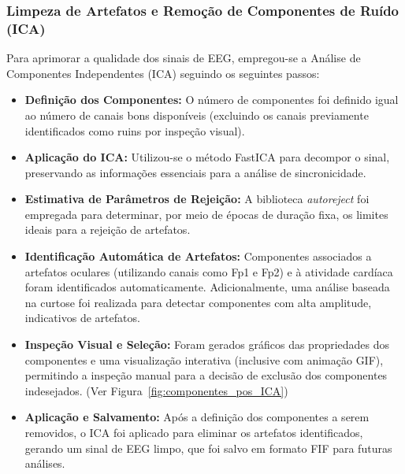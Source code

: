 \subsubsection{Limpeza de Artefatos e Remoção de Componentes de Ruído (ICA)}
Para aprimorar a qualidade dos sinais de EEG, empregou-se a Análise de Componentes Independentes (ICA) seguindo os seguintes passos:
\begin{itemize}
    \item \textbf{Definição dos Componentes:} O número de componentes foi definido igual ao número de canais bons disponíveis (excluindo os canais previamente identificados como ruins por inspeção visual).
    \item \textbf{Aplicação do ICA:} Utilizou-se o método FastICA para decompor o sinal, preservando as informações essenciais para a análise de sincronicidade.
    \item \textbf{Estimativa de Parâmetros de Rejeição:} A biblioteca \textit{autoreject} foi empregada para determinar, por meio de épocas de duração fixa, os limites ideais para a rejeição de artefatos.
    \item \textbf{Identificação Automática de Artefatos:} Componentes associados a artefatos oculares (utilizando canais como Fp1 e Fp2) e à atividade cardíaca foram identificados automaticamente. Adicionalmente, uma análise baseada na curtose foi realizada para detectar componentes com alta amplitude, indicativos de artefatos.
    \item \textbf{Inspeção Visual e Seleção:} Foram gerados gráficos das propriedades dos componentes e uma visualização interativa (inclusive com animação GIF), permitindo a inspeção manual para a decisão de exclusão dos componentes indesejados. (Ver Figura~\ref{fig:componentes_pos_ICA})
    
    \item \textbf{Aplicação e Salvamento:} Após a definição dos componentes a serem removidos, o ICA foi aplicado para eliminar os artefatos identificados, gerando um sinal de EEG limpo, que foi salvo em formato FIF para futuras análises.
\end{itemize}

